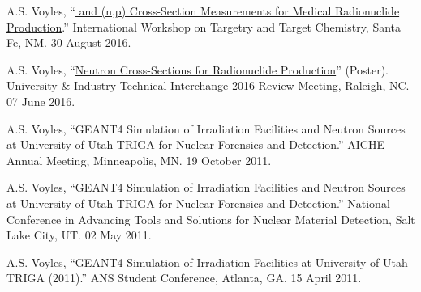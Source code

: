 \begin{bibsection}
\item A.S. Voyles, \enquote{\href{https://slideslive.com/38898186/64cu-and-47scnp-crosssection-measurements-for-medical-radionuclide-production}{ and  (n,p) Cross-Section Measurements for Medical Radionuclide Production}.}  International Workshop on Targetry and Target Chemistry, Santa Fe, NM. 30 August 2016.

\item A.S. Voyles, \enquote{\href{https://github.com/avoyles/posters/blob/master/2016-06-07-UITI/Voyles_UITI2016_Poster_OsloUpdate.pdf}{Neutron Cross-Sections for Radionuclide Production}} (Poster).  University \& Industry Technical Interchange 2016 Review Meeting, Raleigh, NC. 07 June 2016.

\item A.S. Voyles, \enquote{GEANT4 Simulation of Irradiation Facilities and Neutron Sources at University of Utah TRIGA for
Nuclear Forensics and Detection.}  AICHE Annual Meeting, Minneapolis, MN. 19 October 2011.

\item A.S. Voyles, \enquote{GEANT4 Simulation of Irradiation Facilities and Neutron Sources at University of Utah TRIGA for
Nuclear Forensics and Detection.}   National Conference in Advancing Tools and Solutions for
Nuclear Material Detection, Salt Lake City, UT. 02 May 2011.

\item A.S. Voyles, \enquote{GEANT4 Simulation of Irradiation Facilities at University of Utah TRIGA (2011).} 
ANS Student Conference, Atlanta, GA. 15 April 2011.

\end{bibsection}

